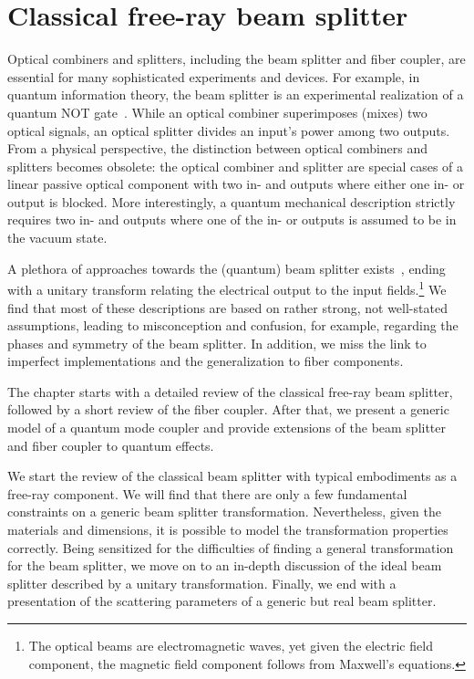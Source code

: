 \section{Classical free-ray beam splitter}\label{sec:beam_splitter}

Optical combiners and splitters, including the beam splitter and fiber coupler, are essential for many sophisticated experiments and devices.
For example, in quantum information theory, the beam splitter is an experimental realization of a quantum NOT gate~\cite{Adami1998}.
While an optical combiner superimposes (mixes) two optical signals, an optical splitter divides an input's power among two outputs.
From a physical perspective, the distinction between optical combiners and splitters becomes obsolete: the optical combiner and splitter are special cases of a linear passive optical component with two in- and outputs where either one in- or output is blocked.
More interestingly, a quantum mechanical description strictly requires two in- and outputs where one of the in- or outputs is assumed to be in the vacuum state.

A plethora of approaches towards the (quantum) beam splitter exists~\cite{Leonhardt2010,Gerry2005,Loudon2000}, ending with a unitary transform relating the electrical output to the input fields.\footnote{The optical beams are electromagnetic waves, yet given the electric field component, the magnetic field component follows from Maxwell's equations.}
We find that most of these descriptions are based on rather strong, not well-stated assumptions, leading to misconception and confusion, for example, regarding the phases and symmetry of the beam splitter.
In addition, we miss the link to imperfect implementations and the generalization to fiber components.

The chapter starts with a detailed review of the classical free-ray beam splitter, followed by a short review of the fiber coupler. After that, we present a generic model of a quantum mode coupler and provide extensions of the beam splitter and fiber coupler to quantum effects.

We start the review of the classical beam splitter with typical embodiments as a free-ray component.
We will find that there are only a few fundamental constraints on a generic beam splitter transformation.
Nevertheless, given the materials and dimensions, it is possible to model the transformation properties correctly.
Being sensitized for the difficulties of finding a general transformation for the beam splitter, we move on to an in-depth discussion of the ideal beam splitter described by a unitary transformation.
Finally, we end with a presentation of the scattering parameters of a generic but real beam splitter.

